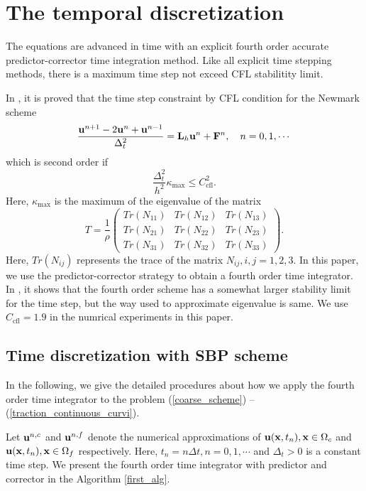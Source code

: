 \documentclass[a4paper]{article}
\begin{document}
\section{The temporal discretization}
The equations are advanced in time with an explicit fourth order accurate predictor-corrector time integration method. Like all explicit time stepping methods, there is a maximum time step not exceed CFL stabilitity limit.

In \cite{?}, it is proved that the time step constraint by CFL condition for the Newmark scheme 
\begin{equation*}
\frac{{\bf u}^{n+1}-2{\bf u}^n + {\bf u}^{n-1}}{\Delta_t^2} = {\bf L}_h{\bf u}^n + {\bf F}^n, \ \ \ n = 0,1,\cdots
\end{equation*}
 which is second order if
\begin{equation*}
\frac{\Delta_t^2}{h^2}\kappa_{\text{max}}\leq C_{\text{cfl}}^2.
\end{equation*}
Here, 
$\kappa_{\text{max}}$ is the maximum of the eigenvalue of the matrix 
\[T = \frac{1}{\rho}\left(\begin{array}{ccc}
Tr(N_{11}) &  Tr(N_{12})& Tr(N_{13})\\
Tr(N_{21}) & Tr(N_{22}) & Tr(N_{23})\\
Tr(N_{31}) & Tr(N_{32}) & Tr(N_{33})\end{array}\right). \]
Here, $Tr(N_{ij})$ represents the trace of the matrix $N_{ij},i,j = 1,2,3$. In this paper, we use the predictor-corrector strategy to obtain a fourth order time integrator. In \cite{?}, it shows that the fourth order scheme has a somewhat larger stability limit for the time step, but the way used to approximate eigenvalue is same. We use $C_{\text{cfl}} = 1.9$ in the numrical experiments in this paper.

\subsection{Time discretization with SBP scheme}
In the following, we give the detailed procedures about how we apply the fourth order time integrator to the problem (\ref{coarse_scheme}) -- (\ref{traction_continuous_curvi}). 

Let ${\bf u}^{n,c}$ and ${\bf u}^{n,f}$ denote the numerical approximations of ${\bf u}({\bf x},t_n), {\bf x}\in\Omega_c$ and ${\bf u}({\bf x},t_n), {\bf x}\in\Omega_f$ respectively. Here, $t_n = n\Delta t, n = 0,1,\cdots$ and $\Delta_t > 0$ is a constant time step. We present the fourth order time integrator with predictor and corrector in the Algorithm \ref{first_alg}.
\end{document}
